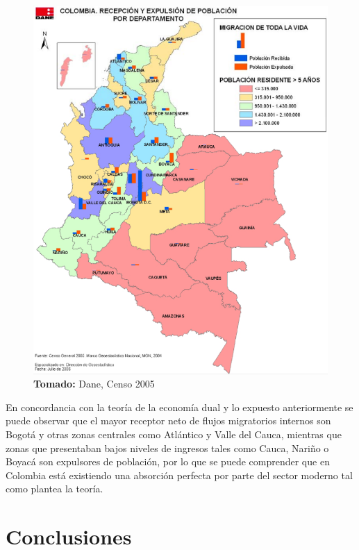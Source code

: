 \documentclass[12pt,letterpaper]{article}
\newcommand*{\captionsource}[2]{%
    \textbf{\\Tomado:} #2%
  }%
\begin{document}
\begin{flushleft}
\begin{figure}[h!]
    \centering
    \includegraphics[scale=0.4]{flujos.png}
    \captionsource{Caption}{Dane, Censo 2005}
\end{figure}

En concordancia con la teoría de la economía dual y lo expuesto anteriormente se puede observar que el mayor receptor neto de flujos migratorios internos
 son Bogotá y otras zonas centrales como Atlántico y Valle del Cauca, mientras que zonas que presentaban bajos niveles de ingresos tales como Cauca, Nariño o Boyacá son expulsores de población, 
 por lo que se puede comprender que en Colombia está existiendo una absorción perfecta por parte del sector moderno tal como plantea la teoría.



\end{flushleft}

\newpage

\section{Conclusiones}
\end{document}
